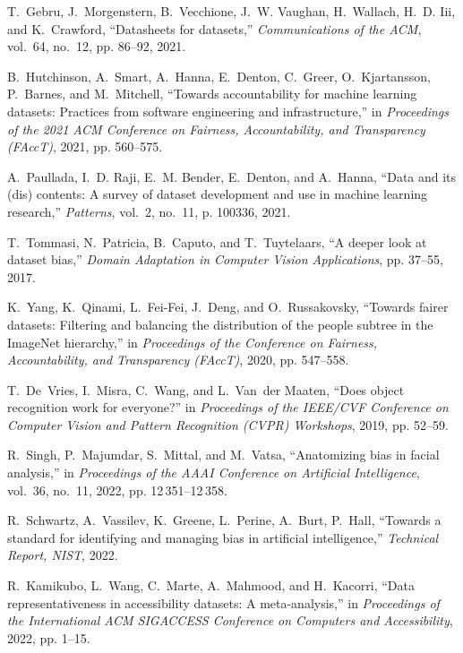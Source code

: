 \documentclass[journal]{IEEEtran}
\begin{document}
\begin{thebibliography}{100}
T.~Gebru, J.~Morgenstern, B.~Vecchione, J.~W. Vaughan, H.~Wallach, H.~D. Iii,
and K.~Crawford, ``Datasheets for datasets,'' \emph{Communications of the
ACM}, vol.~64, no.~12, pp. 86--92, 2021.

B.~Hutchinson, A.~Smart, A.~Hanna, E.~Denton, C.~Greer, O.~Kjartansson,
P.~Barnes, and M.~Mitchell, ``Towards accountability for machine learning
datasets: Practices from software engineering and infrastructure,'' in
\emph{Proceedings of the 2021 ACM Conference on Fairness, Accountability, and
Transparency (FAccT)}, 2021, pp. 560--575.

A.~Paullada, I.~D. Raji, E.~M. Bender, E.~Denton, and A.~Hanna, ``Data and its
(dis) contents: A survey of dataset development and use in machine learning
research,'' \emph{Patterns}, vol.~2, no.~11, p. 100336, 2021.

T.~Tommasi, N.~Patricia, B.~Caputo, and T.~Tuytelaars, ``A deeper look at
dataset bias,'' \emph{Domain Adaptation in Computer Vision Applications}, pp.
37--55, 2017.

K.~Yang, K.~Qinami, L.~Fei-Fei, J.~Deng, and O.~Russakovsky, ``Towards fairer
datasets: Filtering and balancing the distribution of the people subtree in the ImageNet hierarchy,'' in \emph{Proceedings of the Conference on Fairness, Accountability, and Transparency (FAccT)}, 2020, pp. 547--558.

T.~De~Vries, I.~Misra, C.~Wang, and L.~Van~der Maaten, ``Does object
recognition work for everyone?'' in \emph{Proceedings of the IEEE/CVF Conference on Computer Vision and Pattern Recognition (CVPR) Workshops}, 2019, pp. 52--59.

R.~Singh, P.~Majumdar, S.~Mittal, and M.~Vatsa, ``Anatomizing bias in facial
analysis,'' in \emph{Proceedings of the AAAI Conference on Artificial Intelligence}, vol.~36, no.~11, 2022, pp. 12\,351--12\,358.

R.~Schwartz, A.~Vassilev, K.~Greene, L.~Perine, A.~Burt, P.~Hall,
``Towards a standard for identifying and managing bias in artificial intelligence,'' \emph{Technical Report, NIST}, 2022.

R.~Kamikubo, L.~Wang, C.~Marte, A.~Mahmood, and H.~Kacorri, ``Data representativeness in accessibility datasets: A meta-analysis,'' in
\emph{Proceedings of the International ACM SIGACCESS Conference on Computers and Accessibility}, 2022, pp. 1--15.


\end{thebibliography}
\end{document}
